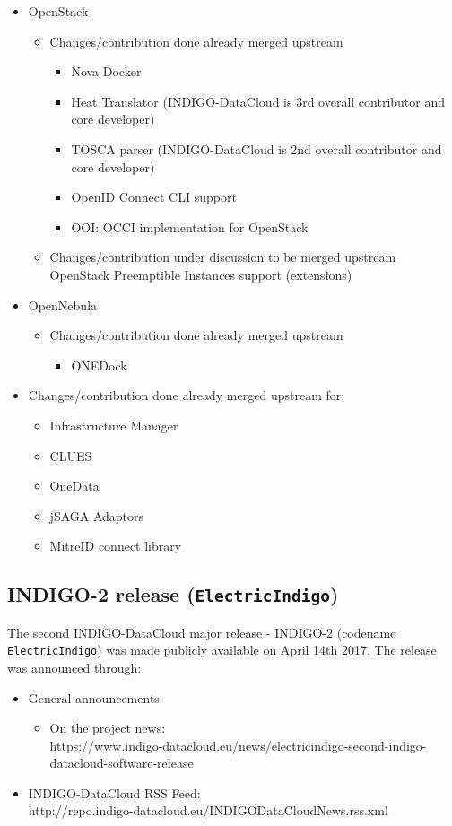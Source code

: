 \documentclass{article}
\begin{document}
\begin{itemize}
\item OpenStack
\begin{itemize}
\item Changes/contribution done already merged upstream
\begin{itemize}
\item Nova Docker
\item Heat Translator (INDIGO-DataCloud is 3rd overall contributor and core developer)
\item TOSCA parser (INDIGO-DataCloud is 2nd overall contributor and core developer)
\item OpenID Connect CLI support
\item OOI: OCCI implementation for OpenStack
\end{itemize}
\item Changes/contribution under discussion to be merged upstream
OpenStack Preemptible Instances support (extensions)
\end{itemize}
\item OpenNebula
\begin{itemize}
\item Changes/contribution done already merged upstream
\begin{itemize}
\item ONEDock
\end{itemize}
\end{itemize}
\item Changes/contribution done already merged upstream for:
\begin{itemize}
\item Infrastructure Manager
\item CLUES
\item OneData
\item jSAGA Adaptors
\item MitreID connect library
\end{itemize}
\end{itemize}


\subsection{INDIGO-2 release ({\tt ElectricIndigo})}

The second INDIGO-DataCloud major release - INDIGO-2 (codename {\tt ElectricIndigo}) was made publicly available on April 14th  2017. The release was announced through:
\begin{itemize}
\item General announcements
\begin{itemize}
\item On the project news: \\
https://www.indigo-datacloud.eu/news/electricindigo-second-indigo-datacloud-software-release
\end{itemize}
\item INDIGO-DataCloud RSS Feed: \\
http://repo.indigo-datacloud.eu/INDIGODataCloudNews.rss.xml
\end{itemize}
\end{document}
